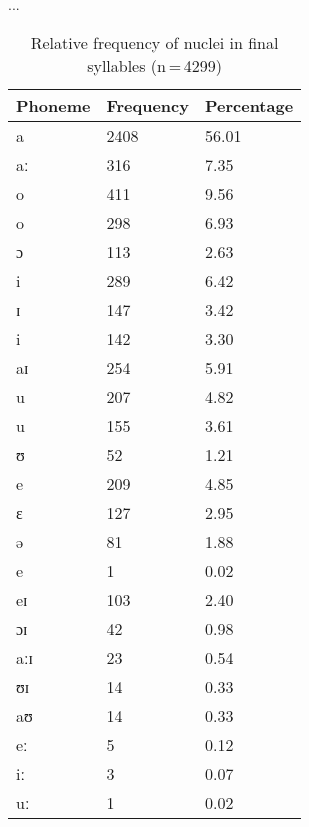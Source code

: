 ...

\begin{table}[hp]\centering
\caption[Relative frequency of nuclei in final syllables]{Relative frequency of nuclei in final syllables (n\,=\,4299)}
\begin{tabu} to 0.5\textwidth{X X[c] X[c]}
\tableheaderfont\toprule
Phoneme
	& Frequency
	& Percentage
	\\
	
\toprule

a	&	2408	&	56.01\pct\\
aː	&	316	&	7.35\pct\\

\midrule

o	&	411	&	9.56\pct\\
\rowfont{\scriptsize\itshape}
\raggedleft
o	&	298	&	6.93\pct\\
\rowfont{\scriptsize\itshape}
\raggedleft
ɔ	&	113	&	2.63\pct\\

\midrule

i	&	289	&	6.42\pct\\
\rowfont{\scriptsize\itshape}
\raggedleft
ɪ	&	147	&	3.42\pct\\
\rowfont{\scriptsize\itshape}
\raggedleft
i	&	142	&	3.30\pct\\

\midrule

aɪ	&	254	&	5.91\pct\\

\midrule

u	&	207	&	4.82\pct\\
\rowfont{\scriptsize\itshape}
\raggedleft
u	&	155	&	3.61\pct\\
\rowfont{\scriptsize\itshape}
\raggedleft
ʊ	&	52	&	1.21\pct\\

\midrule

e	&	209	&	4.85\pct\\
\rowfont{\scriptsize\itshape}
\raggedleft
ɛ	&	127	&	2.95\pct\\
\rowfont{\scriptsize\itshape}
\raggedleft
ə	&	81	&	1.88\pct\\
\rowfont{\scriptsize\itshape}
\raggedleft
e	&	1	&	0.02\pct\\

\midrule

eɪ	&	103	&	2.40\pct\\
ɔɪ	&	42	&	0.98\pct\\
aːɪ	&	23	&	0.54\pct\\
ʊɪ	&	14	&	0.33\pct\\
aʊ	&	14	&	0.33\pct\\
eː	&	5	&	0.12\pct\\
iː	&	3	&	0.07\pct\\
uː	&	1	&	0.02\pct\\

\bottomrule
\end{tabu}
\label{tab:finnuc}
\end{table}

